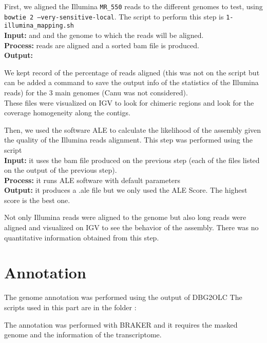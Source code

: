 \documentclass[a4paper,12pt]{article}
\begin{document}
First, we aligned the Illumina \texttt{MR\_550} reads to the different genomes to test, using \texttt{bowtie 2 --very-sensitive-local}. The script to perform this step is \texttt{1-illumina\_mapping.sh}\\
\textbf{Input:}  and  and the genome to which the reads will be aligned.\\
\textbf{Process:} reads are aligned and a sorted bam file is produced.\\
\textbf{Output:} %

We kept record of the percentage of reads aligned (this was not on the script but can be added a command to save the output info of the statistics of the Illumina reads) for the 3 main genomes (Canu was not considered). \\

These files were visualized on IGV to look for chimeric regions and look for the coverage homogeneity along the contigs.

Then, we used the software ALE to calculate the likelihood of the assembly given the quality of the Illumina reads alignment. This step was performed using the script \\
\textbf{Input:} it uses the bam file produced on the previous step (each of the files listed on the output of the previous step).\\
\textbf{Process:} it runs ALE software with default parameters\\
\textbf{Output:} it produces a .ale file but we only used the ALE Score. The highest score is the best one.

Not only Illumina reads were aligned to the genome but also long reads were aligned and visualized on IGV to see the behavior of the assembly. There was no quantitative information obtained from this step.


\section{Annotation}

The genome annotation was performed using the output of DBG2OLC 
The scripts used in this part are in the folder :

The annotation was performed with BRAKER and it requires the masked genome and the information of the transcriptome.
\end{document}
